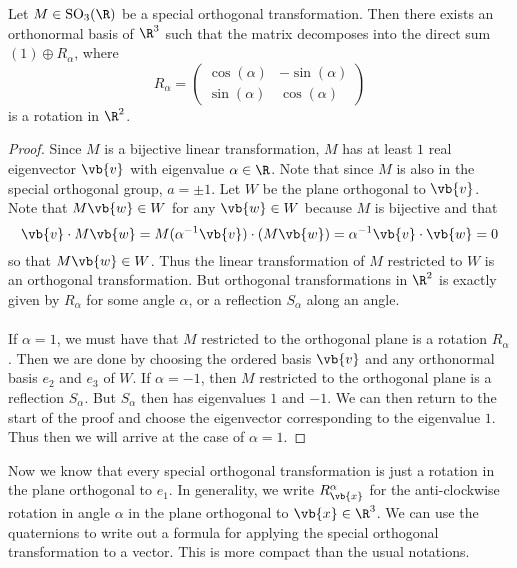 \documentclass[a4paper]{article}
\begin{document}
\begin{prp}{}{} Let $M\in\text{SO}_3(\R)$ be a special orthogonal transformation. Then there exists an orthonormal basis of $\R^3$ such that the matrix decomposes into the direct sum $(1)\oplus R_\alpha$, where $$R_\alpha=\begin{pmatrix}
\cos(\alpha) & -\sin(\alpha)\\
\sin(\alpha) & \cos(\alpha)
\end{pmatrix}$$ is a rotation in $\R^2$. \tcbline
\begin{proof}
Since $M$ is a bijective linear transformation, $M$ has at least $1$ real eigenvector $\vb{v}$ with eigenvalue $\alpha\in\R$. Note that since $M$ is also in the special orthogonal group, $a=\pm1$. Let $W$ be the plane orthogonal to $\vb{v}$. Note that $M\vb{w}\in W$ for any $\vb{w}\in W$ because $M$ is bijective and that $$\vb{v}\cdot M\vb{w}=M(\alpha^{-1}\vb{v})\cdot(M\vb{w})=\alpha^{-1}\vb{v}\cdot\vb{w}=0$$ so that $M\vb{w}\in W$. Thus the linear transformation of $M$ restricted to $W$ is an orthogonal transformation. But orthogonal transformations in $\R^2$ is exactly given by $R_\alpha$ for some angle $\alpha$, or a reflection $S_\alpha$ along an angle. \\~\\

If $\alpha=1$, we must have that $M$ restricted to the orthogonal plane is a rotation $R_\alpha$. Then we are done by choosing the ordered basis $\vb{v}$ and any orthonormal basis $e_2$ and $e_3$ of $W$. If $\alpha=-1$, then $M$ restricted to the orthogonal plane is a reflection $S_\alpha$. But $S_\alpha$ then has eigenvalues $1$ and $-1$. We can then return to the start of the proof and choose the eigenvector corresponding to the eigenvalue $1$. Thus then we will arrive at the case of $\alpha=1$. 
\end{proof}
\end{prp}

Now we know that every special orthogonal transformation is just a rotation in the plane orthogonal to $e_1$. In generality, we write $R_{\vb{x}}^\alpha$ for the anti-clockwise rotation in angle $\alpha$ in the plane orthogonal to $\vb{x}\in\R^3$. We can use the quaternions to write out a formula for applying the special orthogonal transformation to a vector. This is more compact than the usual notations. 
\end{document}
